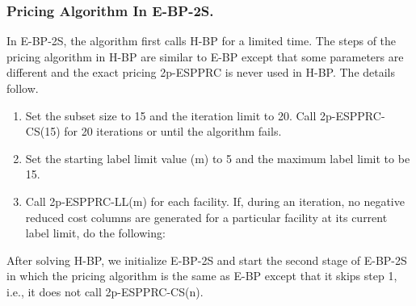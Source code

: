 \subsubsection{Pricing Algorithm In E-BP-2S.}
In E-BP-2S, the algorithm first calls H-BP for a limited time. 
The steps of the pricing algorithm in H-BP are similar to E-BP except that some parameters 
are different and the exact pricing 2p-ESPPRC is never used in H-BP.  The details follow. 
\begin{enumerate}
\item Set the subset size to 15 and the iteration limit to 20. 
Call 2p-ESPPRC-CS(15) for 20 iterations or until the algorithm fails. 
\item Set the starting label limit value (m) to 5 and the maximum label limit
to be 15.  
\item Call 2p-ESPPRC-LL(m) for each facility. If, during an iteration, no negative reduced 
cost columns are generated for a particular facility at its current label limit, 
do the following:
\end{enumerate}

After solving H-BP, we initialize E-BP-2S and start the second stage of E-BP-2S in which
the pricing algorithm is the same as E-BP except that it skips step 1, i.e., it does not call 
2p-ESPPRC-CS(n). 

